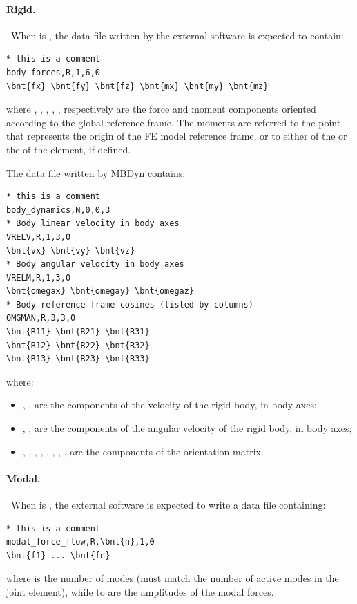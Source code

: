 \paragraph{Rigid.} \
When  is , the data file written by the external software
is expected to contain:
\begin{Verbatim}[commandchars=\\\{\}]
* this is a comment
body_forces,R,1,6,0
\bnt{fx} \bnt{fy} \bnt{fz} \bnt{mx} \bnt{my} \bnt{mz}
\end{Verbatim}
where , , , , , 
respectively are the force and moment components
oriented according to the global reference frame.
The moments are referred to the point that represents the origin
of the FE model reference frame, or to either of
the  or the  of the  element,
if defined.

The data file written by MBDyn contains:
\begin{Verbatim}[commandchars=\\\{\}]
* this is a comment
body_dynamics,N,0,0,3
* Body linear velocity in body axes
VRELV,R,1,3,0
\bnt{vx} \bnt{vy} \bnt{vz}
* Body angular velocity in body axes
VRELM,R,1,3,0
\bnt{omegax} \bnt{omegay} \bnt{omegaz}
* Body reference frame cosines (listed by columns)
OMGMAN,R,3,3,0
\bnt{R11} \bnt{R21} \bnt{R31}
\bnt{R12} \bnt{R22} \bnt{R32}
\bnt{R13} \bnt{R23} \bnt{R33}
\end{Verbatim}
where:
\begin{itemize}
\item {}, ,  are the components of the velocity
	of the rigid body, in body axes;
\item {}, ,  are the components
	of the angular velocity of the rigid body, in body axes;
\item {}, , , , , ,
	, ,  are the components
	of the orientation matrix.
\end{itemize}

\paragraph{Modal.} \
When  is , the external software is expected to write
a data file containing:
\begin{Verbatim}[commandchars=\\\{\}]
* this is a comment
modal_force_flow,R,\bnt{n},1,0
\bnt{f1} ... \bnt{fn}
\end{Verbatim}
where  is the number of modes (must match the number of active modes
in the  joint element), while  to  are the amplitudes
of the modal forces.

